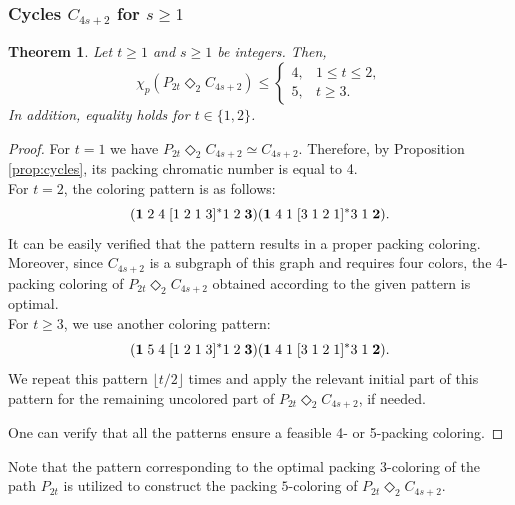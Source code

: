 \documentclass{article}
\newtheorem{theorem}{Theorem}
\begin{document}
\subsubsection{Cycles $C_{4s+2}$ for $s\geq 1$}
\begin{theorem}
    Let $t\geq 1$ and $s\geq 1$ be integers. Then,
  $$\chi_p(P_{2t}\Diamond_2 C_{4s+2})\leq\left\{
\begin{array}{ll}
4, & 1 \leq t \leq 2,\\
5, & t \geq 3.
\end{array}\right.
$$ 
In addition, equality holds for $t \in \{1,2\}$. 
\end{theorem}
\begin{proof}
For $t=1$ we have $P_{2t}\Diamond_2 C_{4s+2} \simeq C_{4s+2}$. Therefore, by Proposition \ref{prop:cycles}, its packing chromatic number is equal to 4.  
\\For $t=2$, the coloring pattern is as follows: $$({\bf 1}\; 2\; 4\; [1\;2\;1\;3]^* 1\; 2\; {\bf 3})({\bf 1}\; 4\; 1\; [3\; 1\; 2\; 1]^*3\; 1\; {\bf 2}).$$
It can be easily verified that the pattern results in a proper packing coloring. Moreover, since $C_{4s+2}$ is a subgraph of this graph and requires four colors, the 4-packing coloring of $P_{2t}\Diamond_2 C_{4s+2}$ obtained according to the given pattern is optimal.
\\ For $t\geq 3$, we use another coloring pattern: $$({\bf 1}\; 5\; 4\; [1\;2\;1\;3]^* 1\; 2\; {\bf 3})({\bf 1}\; 4\; 1\; [3\; 1\; 2\; 1]^*3\; 1\; {\bf 2}).$$ We repeat this pattern $\lfloor t/2 \rfloor$ times and apply the relevant initial part of this pattern for the remaining uncolored part of $P_{2t} \Diamond_2 C_{4s+2}$, if needed.

One can verify that all the patterns ensure a feasible 4- or 5-packing coloring.
\end{proof}

Note that the pattern corresponding to the optimal packing $3$-coloring of the path $P_{2t}$ is utilized to construct the packing $5$-coloring of $P_{2t} \Diamond_2 C_{4s+2}$.

\end{document}
